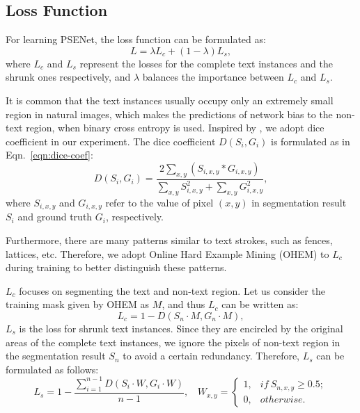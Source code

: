 \documentclass{article}
\begin{document}
\subsection{Loss Function}
For learning PSENet, the loss function can be formulated as:
\begin{equation}
	L =  \lambda L_c + (1 - \lambda) L_s,
	\label{eqn:loss-tot}
\end{equation}
where $L_c$ and $L_s$ represent the losses for the complete text instances and the shrunk ones respectively, and $\lambda$ balances the importance between $L_c$ and $L_s$. 

It is common that the text instances usually occupy only an extremely small region in natural images, which makes the predictions of network bias to the non-text region, when binary cross entropy \cite{de2005tutorial} is used. Inspired by \cite{milletari2016v}, we adopt dice coefficient in our experiment. The dice coefficient $D(S_i, G_i)$ is formulated as in Eqn.~\eqref{eqn:dice-coef}:
\begin{equation}
	D(S_i, G_i) = \frac{2 \sum\nolimits_{x,y} (S_{i, x, y} * G_{i, x, y})}{\sum\nolimits_{x, y} S_{i, x, y}^2 + \sum\nolimits_{x, y} G_{i, x, y}^2},
	\label{eqn:dice-coef}
\end{equation}
where $S_{i, x, y}$ and $G_{i, x, y}$ refer to the value of pixel $(x, y)$ in segmentation result $S_i$ and ground truth $G_i$, respectively. 

Furthermore, there are many patterns similar to text strokes, such as fences, lattices, etc. Therefore, we adopt Online Hard Example Mining (OHEM) \cite{shrivastava2016training} to $L_c$ during training to better distinguish these patterns.

$L_c$ focuses on segmenting the text and non-text region. Let us consider the training mask given by OHEM as $M$, and thus $L_c$ can be written as:
\begin{equation}
	L_c = 1 - D(S_n \cdot M, G_n \cdot M),
	\label{eqn:loss-complete}
\end{equation}
$L_s$ is the loss for shrunk text instances. Since they are encircled by the original areas of the complete text instances, we ignore the pixels of non-text region in the segmentation result $S_n$ to avoid a certain redundancy. Therefore, $L_s$ can be formulated as follows:
\begin{equation}
	L_s = 1 - \frac{\sum\nolimits_{i = 1}^{n - 1} D(S_i \cdot W, G_i \cdot W)}{n - 1},\ \ \ \  W_{x, y} = 
	\left\{
	\begin{array}{ll}
	1, & if \ S_{n, x, y} \ge 0.5; \\  
	0, & otherwise.   
	\end{array}
	\right.  
	\label{eqn:loss-shrink}
\end{equation}
\end{document}
